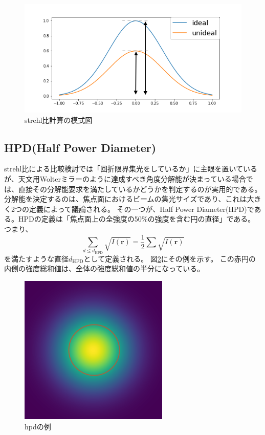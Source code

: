 \documentclass[dvipdfmx,autodetect-engine]{jreport}
\begin{document}
\begin{figure}[h!]
\centering
\includegraphics[scale=0.6]{images/error_simulation/explanation/strehl.png}
\caption{strehl比計算の模式図}
\label{fig:strehl_explanation}
\end{figure}

\subsection{HPD(Half Power Diameter)}
strehl比による比較検討では「回折限界集光をしているか」に主眼を置いているが、天文用Wolterミラーのように達成すべき角度分解能が決まっている場合では、直接その分解能要求を満たしているかどうかを判定するのが実用的である。
分解能を決定するのは、焦点面におけるビームの集光サイズであり、これは大きく2つの定義によって議論される。
その一つが、Half Power Diameter(HPD)である。HPDの定義は「焦点面上の全強度の50\%の強度を含む円の直径」である。つまり、
\[
    \sum_{d\leq d_{\mathrm{HPD}}} \sqrt{ I(\mathbf{r}) } = \frac{1}{2} \sum \sqrt{ I(\mathbf{r}) }
\]
を満たすような直径$d_{\mathrm{HPD}}$として定義される。
図\ref{fig:hpd_explanation}にその例を示す。
この赤円の内側の強度総和値は、全体の強度総和値の半分になっている。

\begin{figure}[h!]
\centering
\includegraphics[scale=0.6]{images/error_simulation/explanation/hpd.png}
\caption{hpdの例}
\label{fig:hpd_explanation}
\end{figure}
\end{document}
